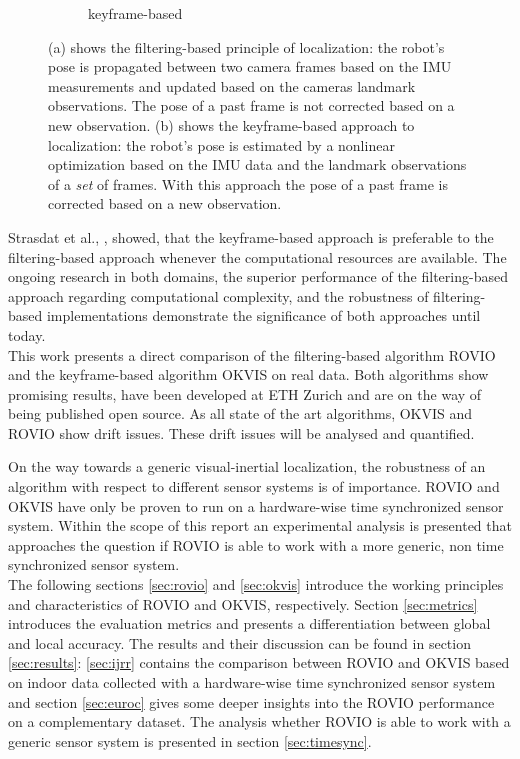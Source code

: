 \begin{figure}
\begin{subfigure}[b]{0.4\textwidth}
    \caption{keyframe-based}
    \label{fig:2}
  \end{subfigure}
\caption{(a) shows the filtering-based principle of localization: the robot's pose is propagated between two camera frames based on the IMU measurements and updated based on the cameras landmark observations. The pose of a past frame is not corrected based on a new observation. (b) shows the keyframe-based approach to localization: the robot's pose is estimated by a nonlinear optimization based on the IMU data and the landmark observations of a \textit{set} of frames. With this approach the pose of a past frame is corrected based on a new observation.}
\label{pics:filtering_keyframe}
\end{figure}

Strasdat et al., \cite{strasdat2010real}, showed, that the keyframe-based approach is preferable to the filtering-based approach whenever the computational resources are available. The ongoing research in both domains, the superior performance of the filtering-based approach regarding computational complexity, and the robustness of filtering-based implementations demonstrate the significance of both approaches until today. \\

This work presents a direct comparison of the filtering-based algorithm ROVIO and the keyframe-based algorithm OKVIS on real data. Both algorithms show promising results, have been developed at ETH Zurich and are on the way of being published open source. As all state of the art algorithms, OKVIS and ROVIO show drift issues. These drift issues will be analysed and quantified. 

On the way towards a generic visual-inertial localization, the robustness of an algorithm with respect to different sensor systems is of importance. ROVIO and OKVIS have only be proven to run on a hardware-wise time synchronized sensor system. Within the scope of this report an experimental analysis is presented that approaches the question if ROVIO is able to work with a more generic, non time synchronized sensor system. \\

The following sections \ref{sec:rovio} and \ref{sec:okvis} introduce the working principles and characteristics of ROVIO and OKVIS, respectively. Section \ref{sec:metrics} introduces the evaluation metrics and presents a differentiation between global and local accuracy. The results and their discussion can be found in section \ref{sec:results}: \ref{sec:ijrr} contains the comparison between ROVIO and OKVIS based on indoor data collected with a hardware-wise time synchronized sensor system and section \ref{sec:euroc} gives some deeper insights into the ROVIO performance on a complementary dataset. The analysis whether ROVIO is able to work with a generic sensor system is presented in section \ref{sec:timesync}. \\
